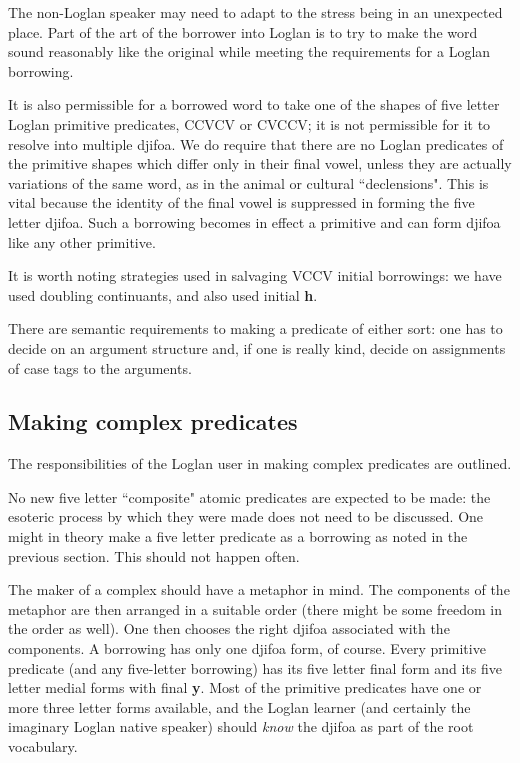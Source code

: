 \documentclass[12pt]{book}
\begin{document}
{The non-Loglan speaker may need to adapt to the stress being in an unexpected place.  Part of the art of the borrower into Loglan is to try to make the word sound reasonably like the original while meeting the requirements for a Loglan borrowing.

It is also permissible for a borrowed word to take one of the shapes of five letter Loglan primitive predicates, CCVCV or CVCCV; it is not permissible for it to resolve into multiple djifoa.  We do require that there are no Loglan predicates of the primitive shapes which differ only in their final vowel, unless they are actually variations of the same word, as in the animal or cultural ``declensions".  This is vital because the identity of the final vowel is suppressed in forming the five letter djifoa.  Such a borrowing becomes in effect a primitive and can form djifoa like any other primitive.

It is worth noting strategies used in salvaging VCCV initial borrowings:  we have used doubling continuants, and also used initial {\bf h}.

There are semantic requirements to making a predicate of either sort:  one has to decide on an argument structure and, if one is really kind, decide on assignments of case tags to the arguments.

\subsection{Making complex predicates}

The responsibilities of the Loglan user in making complex predicates are outlined.

No new five letter ``composite" atomic predicates are expected to be made:  the esoteric process by which they were made does not need to be discussed.  One might in theory make a five letter predicate
as a borrowing as noted in the previous section.  This should not happen often.

The maker of a complex should have a metaphor in mind.  The components of the metaphor are then arranged in a suitable order (there might be some freedom in the order
as well).  One then chooses the right djifoa associated with the components.   A borrowing has only one djifoa form, of course.  Every primitive predicate (and any five-letter borrowing) has its five letter final form
and its five letter medial forms with final {\bf y}.  Most of the primitive predicates have one or more three letter forms available, and the Loglan learner (and certainly the imaginary Loglan native speaker) should {\em know\/} the djifoa as part of the root vocabulary.

}
\end{document}
